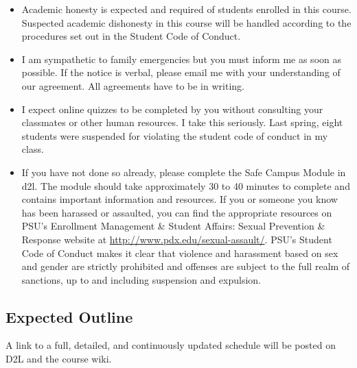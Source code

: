 \documentclass[letterpaper,10pt]{article}
\begin{document}
\begin{itemize}
\item Academic honesty is expected and required of students enrolled
  in this course.  Suspected academic dishonesty in this course will
  be handled according to the procedures set out in the Student Code
  of Conduct.

\item I am sympathetic to family emergencies but you must inform me as
  soon as possible. If the notice is verbal, please email me with your
  understanding of our agreement. All agreements have to be in
  writing.

\item I expect online quizzes to be completed by you without consulting your classmates or other human resources.  I take this seriously.  Last spring, eight students were suspended for violating the student code of conduct in my class.

\item If you have not done so already, please complete the Safe Campus Module in d2l. The module should take approximately 30 to 40 minutes to complete and contains important information and resources. If you or someone you know has been harassed or assaulted, you can find the appropriate resources on PSU’s Enrollment Management \& Student Affairs: Sexual Prevention \& Response website at \url{http://www.pdx.edu/sexual-assault/}. PSU's Student Code of Conduct makes it clear that violence and harassment based on sex and gender are strictly prohibited and offenses are subject to the full realm of sanctions, up to and including suspension and expulsion. 

\end{itemize}


\subsection{Expected Outline}
A link to a full, detailed, and continuously updated schedule will be
posted on D2L and the course wiki.
\end{document}
